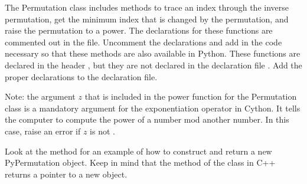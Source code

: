 \begin{problem}
The Permutation class includes methods to trace an index through the inverse permutation, get the minimum index that is changed by the permutation, and raise the permutation to a power.
The declarations for these functions are commented out in the  file.
Uncomment the declarations and add in the code necessary so that these methods are also available in Python.
These functions are declared in the header , but they are not declared in the declaration file .
Add the proper declarations to the declaration file.

Note: the argument $z$ that is included in the power function for the Permutation class is a mandatory argument for the exponentiation operator in Cython.
It tells the computer to compute the power of a number mod another number.
In this case, raise an error if $z$ is not .

Look at the  method for an example of how to construct and return a new PyPermutation object.
Keep in mind that the  method of the  class in C++ returns a pointer to a new  object.
\end{problem}

\let\of\undefined